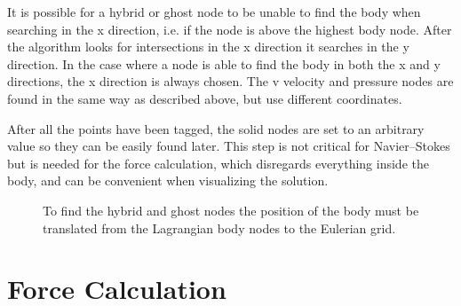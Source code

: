 \documentclass[onehalf,11pt]{beavtex}
\begin{document}
It is possible for a hybrid or ghost node to be unable to find the body when searching in the x direction, i.e. if the node is above the highest body node.
After the algorithm looks for intersections in the x direction it searches in the y direction.
In the case where a node is able to find the body in both the x and y directions, the x direction is always chosen. 
The v velocity and pressure nodes are found in the same way as described above, but use different coordinates.

After all the points have been tagged, the solid nodes are set to an arbitrary value so they can be easily found later.
This step is not critical for Navier--Stokes but is needed for the force calculation, which disregards everything inside the body, and can be convenient when visualizing the solution.
\begin{figure}
	\centering
	
	\caption{To find the hybrid and ghost nodes the position of the body must be translated from the Lagrangian body nodes to the Eulerian grid.}
	\label{fig:node id 1}
\end{figure}

\section{Force Calculation}
\label{Force Calculation}
\end{document}
